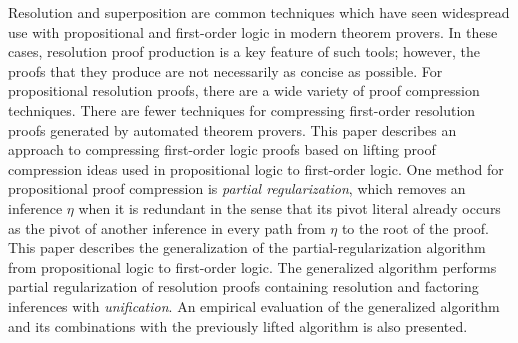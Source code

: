 Resolution and superposition are common techniques which have seen widespread use with propositional and first-order logic in modern theorem provers. In these cases, resolution proof production is a key feature of such tools; however, the proofs that they produce are not necessarily as concise as possible.
For propositional resolution proofs, there are a wide variety of proof compression techniques. There are fewer techniques for compressing first-order resolution proofs generated by automated theorem provers.
This paper describes an approach to compressing first-order logic proofs based on lifting proof compression ideas used in propositional logic to first-order logic. One method for propositional proof compression is \emph{partial regularization}, which removes an inference $\eta$ when it is redundant in the sense that its pivot literal already occurs as the pivot of another inference in every path from $\eta$ to the root of the proof. 
This paper describes the generalization of the partial-regularization algorithm
\RecyclePivotsIntersection \cite{TODO}
from propositional logic to first-order logic. The generalized algorithm performs partial regularization of resolution proofs containing resolution and factoring inferences with \emph{unification}. %
An empirical evaluation of the generalized algorithm and its combinations with the previously lifted \SFOLowerUnits algorithm
\cite{TODO} is also presented.




